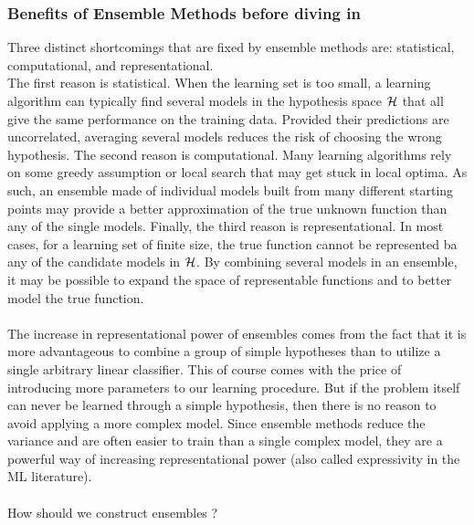 \subsubsection{Benefits of Ensemble Methods before diving in}
Three distinct shortcomings that are fixed by ensemble methods are: statistical, computational, and representational.\\
The first reason is statistical. When the learning set is too small, a learning algorithm can typically find several models in the hypothesis space $\mathcal{H}$ that all give the same performance on the training data. Provided their predictions are uncorrelated, averaging several models reduces the risk of choosing the wrong hypothesis. The second reason is computational. Many learning algorithms rely on some greedy assumption or local search that may get stuck in local optima. As such, an ensemble made of individual models built from many different starting points may provide a better approximation of the true unknown function than any of the single models. Finally, the third reason is representational. In most cases, for a learning set of finite size, the true function cannot be represented ba any of the candidate models in $\mathcal{H}$. By combining several models in an ensemble, it may be possible to expand the space of representable functions and to better model the true function.\\
\\ 
The increase in representational power of ensembles comes from the fact that it is more advantageous to combine a group of simple hypotheses than to utilize a single arbitrary linear classifier. This of course comes with the price of introducing more parameters to our learning procedure. But if the problem itself can never be learned through a simple hypothesis, then there is no reason to avoid applying a more complex model. Since ensemble methods reduce the variance and are often easier to train than a single complex model, they are a powerful way of increasing representational power (also called expressivity in the ML literature).\\
\\
How should we construct ensembles ?\\
